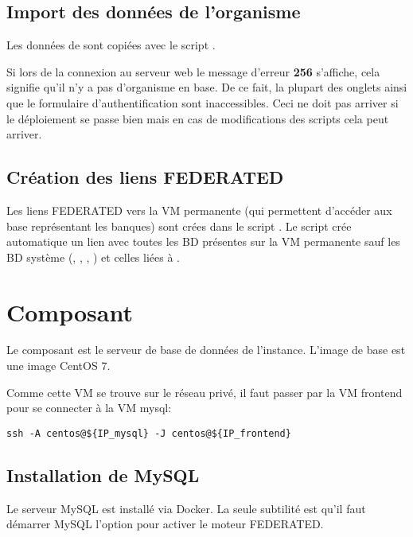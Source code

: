 \subsection{Import des données de l'organisme \theOrg{}}

Les données de \theOid{} sont copiées avec le script .

\begin{mycolorbox}
    Si lors de la connexion au serveur web le message d'erreur \textbf{256} s'affiche, cela signifie qu'il n'y a pas d'organisme en base.
    De ce fait, la plupart des onglets ainsi que le formulaire d'authentification sont inaccessibles.
    Ceci ne doit pas arriver si le déploiement se passe bien mais en cas de modifications des scripts cela peut arriver.
\end{mycolorbox}

\subsection{Création des liens FEDERATED}

Les liens FEDERATED vers la VM permanente (qui permettent d'accéder aux base représentant les banques) sont crées
dans le script .
Le script crée automatique un lien avec toutes les BD présentes sur la VM permanente sauf les BD système (, , , )
et celles liées à .

\section{Composant }\label{mysql}

Le composant  est le serveur de base de données de l'instance.
L'image de base est une image CentOS 7.

Comme cette VM se trouve sur le réseau privé, il faut passer par la VM frontend pour se connecter à la VM mysql:
\begin{lstlisting}[style=bash]
ssh -A centos@${IP_mysql} -J centos@${IP_frontend}
\end{lstlisting}

\subsection{Installation de MySQL}

Le serveur MySQL est installé via Docker.
La seule subtilité est qu'il faut démarrer MySQL l'option  pour activer le moteur FEDERATED.

